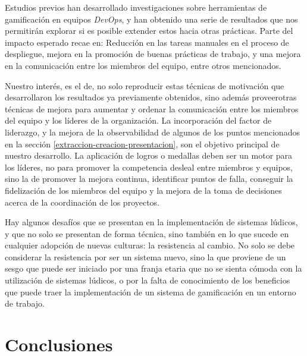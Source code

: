 \documentclass[journal]{IEEEtran}
\begin{document}
Estudios previos han desarrollado investigaciones sobre herramientas de gamificación en equipos \textit{DevOps}, y han obtenido una serie de resultados que nos permitirán explorar si es posible extender estos hacia otras prácticas. Parte del impacto esperado recae en\cite{ayoup2022achievement}: Reducción en las tareas manuales en el proceso de despliegue, mejora en la promoción de buenas prácticas de trabajo, y una mejora en la comunicación entre los miembros del equipo, entre otros mencionados.

Nuestro interés, es el de, no solo reproducir estas técnicas de motivación que desarrollaron los resultados ya previamente obtenidos, sino además proveerotras técnicas de mejora para aumentar y ordenar la comunicación entre los miembros del equipo y los líderes de la organización. La incorporación del factor de liderazgo, y la mejora de la observabilidad de algunos de los puntos mencionados en la sección \ref{extraccion-creacion-presentacion}, son el objetivo principal de nuestro desarrollo. La aplicación de logros o medallas deben ser un motor para los líderes, no para promover la competencia desleal entre miembros y equipos, sino la de promover la mejora continua, identificar puntos de falla, conseguir la fidelización de los miembros del equipo y la mejora de la toma de decisiones acerca de la coordinación de los proyectos.

Hay algunos desafíos que se presentan en la implementación de sistemas lúdicos, y que no solo se presentan de forma técnica, sino también en lo que sucede en cualquier adopción de nuevas culturas: la resistencia al cambio. No solo se debe considerar la resistencia por ser un sistema nuevo, sino la que proviene de un sesgo que puede ser iniciado por una franja etaria que no se sienta cómoda con la utilización de sistemas lúdicos, o por la falta de conocimiento de los beneficios que puede traer la implementación de un sistema de gamificación en un entorno de trabajo\cite[Quinta Parte: Gamificación - Cuando la gamificación es inútil]{nallar2015estructuraludica}.

\section{\textbf{\Large Conclusiones}}




\end{document}
